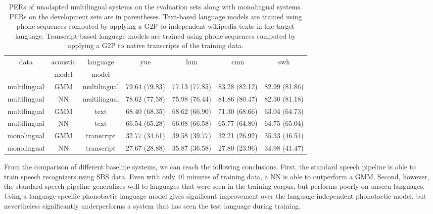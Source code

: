 \begin{table*}
\begin{center}
\begin{tabular}{|c|c|c|cccc|}
\hline
data & acoustic & language & yue & hun & cmn & swh \\
 & model & model &  & & & \\
\hline
multilingual & GMM & multilingual & 79.64 (79.83) & 77.13 (77.85) & 83.28 (82.12) & 82.99 (81.86) \\
multilingual & NN & multilingual & 78.62 (77.58) & 75.98 (76.44) & 81.86 (80.47) & 82.30 (81.18) \\
multilingual & GMM & text & 68.40 (68.35) & 68.62 (66.90) & 71.30 (68.66) & 63.04 (64.73) \\
multilingual & NN & text & 66.54 (65.28) & 66.08 (66.58) & 65.77 (64.80) & 64.75 (65.04) \\
\hline
monolingual & GMM & transcript & 32.77 (34.61) & 39.58 (39.77) & 32.21 (26.92) & 35.33 (46.51) \\
monolingual & NN & transcript & 27.67 (28.88) & 35.87 (36.58) & 27.80 (23.96) & 34.98 (41.47) \\
\hline
\end{tabular}
\caption{\label{tbl:results} PERs of unadapted multilingual systems on
  the evaluation sets along with monolingual systems.  PERs on the
  development sets are in parentheses.  Text-based language models are
  trained using phone sequences computed by applying a G2P to
  independent wikipedia texts in the target language. Transcript-based
  language models are trained using phone sequences computed by
  applying a G2P to native transcripts of the training data.}
\end{center}
\end{table*}

From the comparison of different baseline systems, we can reach the
following conclusions.  First, the standard speech pipeline is able to
train speech recognizers using SBS data.  Even with only 40 minutes of
training data, a NN is able to outperform a GMM.  Second,
however, the standard speech pipeline generalizes well to languages
that were seen in the training corpus, but performs poorly on unseen
languages.  Using a language-specific phonotactic language model gives
significant improvement over the language-independent phonotactic
model, but nevertheless significantly underperforms a system that
has seen the test language during training.  

